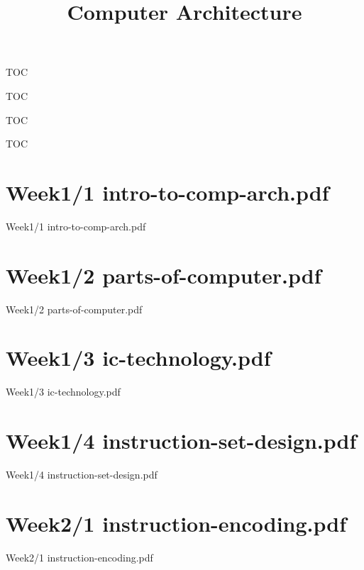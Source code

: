 \documentclass[aspectratio = 169]{beamer}
\title{Computer Architecture}
\begin{document}
\maketitle
\begin{frame}{TOC}
\tableofcontents[sections=1-8]
\end{frame}
\begin{frame}{TOC}
\tableofcontents[sections=9-16]
\end{frame}
\begin{frame}{TOC}
\tableofcontents[sections=17-24]
\end{frame}
\begin{frame}{TOC}
\tableofcontents[sections=25-31]
\end{frame}
\section{Week1/1 intro-to-comp-arch.pdf}
\begin{frame}{Week1/1 intro-to-comp-arch.pdf}
\end{frame}

\section{Week1/2 parts-of-computer.pdf}
\begin{frame}{Week1/2 parts-of-computer.pdf}
\end{frame}

\section{Week1/3 ic-technology.pdf}
\begin{frame}{Week1/3 ic-technology.pdf}
\end{frame}

\section{Week1/4 instruction-set-design.pdf}
\begin{frame}{Week1/4 instruction-set-design.pdf}
\end{frame}

\section{Week2/1 instruction-encoding.pdf}
\begin{frame}{Week2/1 instruction-encoding.pdf}
\end{frame}

\end{document}
